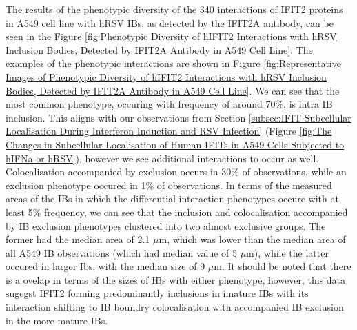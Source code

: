 The results of the phenotypic diversity of the 340 interactions of IFIT2 proteins in A549 cell line with hRSV IBs, as detected by the IFIT2A antibody, can be seen in the Figure \ref{fig:Phenotypic Diversity of hIFIT2 Interactions with hRSV Inclusion Bodies, Detected by IFIT2A Antibody in A549 Cell Line}. The examples of the phenotypic interactions are shown in Figure \ref{fig:Representative Images of Phenotypic Diversity of hIFIT2 Interactions with hRSV Inclusion Bodies, Detected by IFIT2A Antibody in A549 Cell Line}. We can see that the most common phenotype, occuring with frequency of around 70\%, is intra IB inclusion. This aligns with our observations from Section \ref{subsec:IFIT Subcellular Localisation During Interferon Induction and RSV Infection} (Figure \ref{fig:The Changes in Subcellular Localisation of Human IFITs in A549 Cells Subjected to hIFNa or hRSV}), however we see additional interactions to occur as well. Colocalisation accompanied by exclusion occurs in 30\% of observations, while an exclusion phenotype occured in 1\% of observations. In terms of the measured areas of the IBs in which the differential interaction phenotypes occure with at least 5\% frequency, we can see that the inclusion and colocalisation accompanied by IB exclusion phenotypes clustered into two almost exclusive groups. The former had the median area of 2.1 \(\mu \mbox{m}\), which was lower than the median area of all A549 IB observations (which had median value of 5 \(\mu \mbox{m}\)), while the latter occured in larger Ibs, with the median size of 9 \(\mu \mbox{m}\). It should be noted that there is a ovelap in terms of the sizes of IBs with either phenotype, however, this data sugegst IFIT2 forming predominantly inclusions in imature IBs with its interaction shifting to IB boundry colocalisation with accompanied IB exclusion in the more mature IBs.

